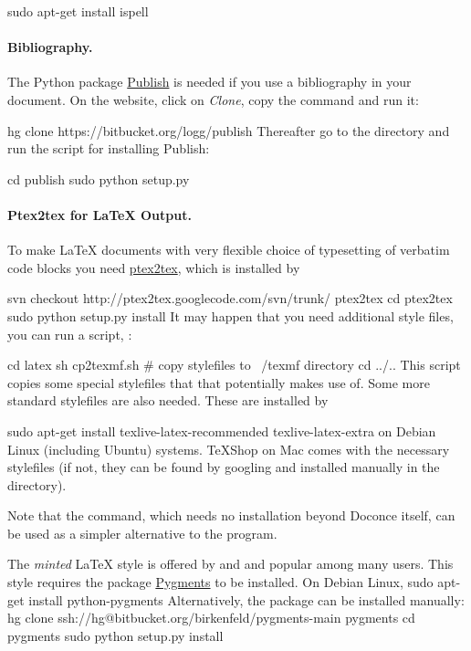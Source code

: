 \documentclass[%
oneside,                 %
final,                   %
10pt]{article}
\begin{document}
\bsys
sudo apt-get install ispell
\esys


\paragraph{Bibliography.}
The Python package \href{{https://bitbucket.org/logg/publish}}{Publish} is needed if you use a bibliography
in your document. On the website, click on \emph{Clone}, copy the
command and run it:

\bsys
hg clone https://bitbucket.org/logg/publish
\esys
Thereafter go to the  directory and run the  script
for installing Publish:

\bsys
cd publish
sudo python setup.py
\esys


\paragraph{Ptex2tex for {\LaTeX} Output.}
To make {\LaTeX} documents with very flexible choice of typesetting of
verbatim code blocks you need \href{{http://code.google.com/p/ptex2tex}}{ptex2tex},
which is installed by

\bsys
svn checkout http://ptex2tex.googlecode.com/svn/trunk/ ptex2tex
cd ptex2tex
sudo python setup.py install
\esys
It may happen that you need additional style files, you can run
a script, :

\bsys
cd latex
sh cp2texmf.sh  # copy stylefiles to ~/texmf directory
cd ../..
\esys
This script copies some special stylefiles that
that  potentially makes use of. Some more standard stylefiles
are also needed. These are installed by

\bsys
sudo apt-get install texlive-latex-recommended texlive-latex-extra
\esys
on Debian Linux (including Ubuntu) systems. TeXShop on Mac comes with
the necessary stylefiles (if not, they can be found by googling and installed
manually in the  directory).

Note that the  command, which needs no installation
beyond Doconce itself, can be used as a simpler alternative to the 
program.

The \emph{minted} {\LaTeX} style is offered by  and 
and popular among many
users. This style requires the package \href{{http://pygments.org}}{Pygments}
to be installed. On Debian Linux,
\bsys
sudo apt-get install python-pygments
\esys
Alternatively, the package can be installed manually:
\bsys
hg clone ssh://hg@bitbucket.org/birkenfeld/pygments-main pygments
cd pygments
sudo python setup.py install
\esys
\end{document}
